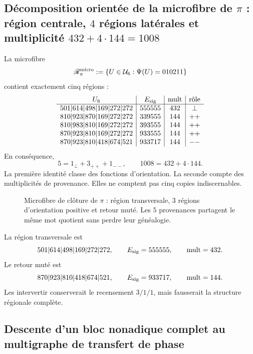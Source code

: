 \subsection{Décomposition orientée de la microfibre de \texorpdfstring{\(\pi\)}{pi} : région centrale, \(4\) régions latérales et multiplicité \texorpdfstring{\(432+4\cdot144=1008\)}{432+4x144=1008}}

La microfibre
\[
 \mathscr R_\pi^{\rm micro}
 :=\{U\in\mathcal U_6:\Psi(U)=010211\}
\]
contient exactement cinq régions :
\[
\begin{array}{c|c|c|c}
U_6&E_{\rm sig}&\operatorname{mult}&\text{rôle}\\ \hline
501|614|498|169|272|272&555555&432&\perp\\
810|923|870|169|272|272&339555&144&++\\
810|983|810|169|272|272&393555&144&++\\
870|923|810|169|272|272&933555&144&++\\
870|923|810|418|674|521&933717&144&--
\end{array}
\]
En conséquence,
\begin{equation}
 \boxed{
 5=1_\perp+3_{++}+1_{--},
 \qquad
 1008=432+4\cdot144.}
 \label{p12-83-c8-s1:eq:descomposiciones-cinco-regiones-pi}
\end{equation}
La première identité classe des fonctions d’orientation. La seconde compte
des multiplicités de provenance. Elles ne comptent pas cinq copies indiscernables.

\begin{figure}[htbp]
\centering
\resizebox{\textwidth}{!}{}
\caption{Microfibre de clôture de \(\pi\) : région transversale,
\(3\) régions d'orientation positive et retour muté. Les \(5\)
provenances partagent le même mot quotient sans perdre leur généalogie.}
\label{fig:cinco-regiones-pi-microfibra-canonica}
\end{figure}

La région transversale est
\[
 501|614|498|169|272|272,
 \qquad E_{\rm sig}=555555,
 \qquad\operatorname{mult}=432.
\]
Le retour muté est
\[
 870|923|810|418|674|521,
 \qquad E_{\rm sig}=933717,
 \qquad\operatorname{mult}=144.
\]
Les intervertir conserverait le recensement \(3/1/1\), mais fausserait la structure
régionale complète.

\subsection{Descente d'un bloc nonadique complet au multigraphe de transfert de phase}

